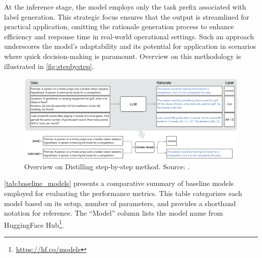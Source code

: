 At the inference stage, the model employs only the task prefix associated with label generation. This strategic focus ensures that the output is streamlined for practical application, omitting the rationale generation process to enhance efficiency and response time in real-world operational settings. Such an approach underscores the model's adaptability and its potential for application in scenarios where quick decision-making is paramount. Overview on this methodology is illustrated in \autoref{fig:stepbystep}.

\begin{figure}[hbt]
    \centering
    \includegraphics[width=0.99\linewidth]{figs/stepbystep.png}
    \caption[Overview on Distilling step-by-step method.]{Overview on Distilling step-by-step method. Source: \cite{stepbystep}.}
    \label{fig:stepbystep}
\end{figure}

\autoref{tab:baseline_models} presents a comparative summary of baseline models employed for evaluating the performance metrics. This table categorizes each model based on its setup, number of parameters, and provides a shorthand notation for reference. The ``Model'' column lists the model name from HuggingFace Hub\footnote{\url{https://hf.co/models}}.

